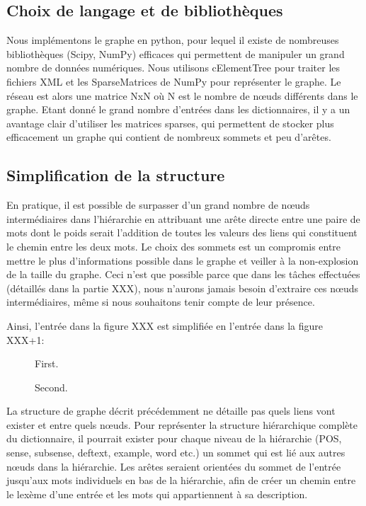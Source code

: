 \documentclass{article}
\begin{document}
\subsection{Choix de langage et de bibliothèques}
Nous implémentons le graphe en python, pour lequel il existe de nombreuses bibliothèques (Scipy, NumPy) efficaces qui permettent de manipuler un grand nombre de données numériques. Nous utilisons cElementTree pour traiter les fichiers XML et les SparseMatrices de NumPy pour représenter le graphe. Le réseau est alors une matrice NxN où N est le nombre de nœuds différents dans le graphe. Etant donné le grand nombre d'entrées dans les dictionnaires, il y a un avantage clair d'utiliser les matrices sparses, qui permettent de stocker plus efficacement un graphe qui contient de nombreux sommets et peu d'arêtes.

\subsection{Simplification de la structure}
En pratique, il est possible de surpasser d'un grand nombre de nœuds intermédiaires dans l'hiérarchie en attribuant une arête directe entre une paire de mots dont le poids serait l'addition de toutes les valeurs des liens qui constituent le chemin entre les deux mots. Le choix des sommets est un compromis entre mettre le plus d'informations possible dans le graphe et veiller à la non-explosion de la taille du graphe. Ceci n'est que possible parce que dans les tâches effectuées (détaillés dans la partie XXX), nous n'aurons jamais besoin d'extraire ces nœuds intermédiaires, même si nous souhaitons tenir compte de leur présence.

Ainsi, l'entrée dans la figure XXX est simplifiée en l'entrée dans la figure XXX+1:

\begin{figure}
\centering
\def\svgscale{0.5}

\end{figure}


\begin{figure}
\centering
\parbox{5cm}{
\def\svgscale{0.5}

\caption{First.}
\label{fig:2figsA}}
\qquad
\begin{minipage}{5cm}
\def\svgscale{0.5}

\caption{Second.}
\label{fig:2figsB}
\end{minipage}
\end{figure}

La structure de graphe décrit précédemment ne détaille pas quels liens vont exister et entre quels nœuds. Pour représenter la structure hiérarchique complète du dictionnaire, il pourrait exister pour chaque niveau de la hiérarchie (POS, sense, subsense, deftext, example, word etc.) un sommet qui est lié aux autres nœuds dans la hiérarchie. Les arêtes seraient orientées du sommet de l'entrée jusqu'aux mots individuels en bas de la hiérarchie, afin de créer un chemin entre le lexème d'une entrée et les mots qui appartiennent à sa description.
\end{document}

